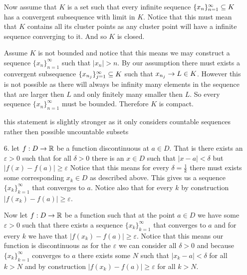 \documentclass[12pt]{amsart}
\begin{document}
\begin{itemize}
        Now assume that $K$ is a set such that every infinite sequence
        $\{x_n\}_{n=1}^\infty\subseteq K$ has a convergent subsequence with limit in $K$.
        Notice that this must mean that $K$ contains all its cluster points as any
        cluster point will have a infinite sequence converging to it. And so $K$ is
        closed.

        Assume $K$ is not bounded and notice that this means we may construct a
        sequence $\{x_n\}_{n=1}^\infty$ such that $|x_n|>n$. By our assumption there
        must exists a convergent subsequence $\{x_{n_j}\}_{j=1}^\infty\subseteq K$ such that
        $x_{n_j}\rightarrow L\in K$. However this is not possible as there will always be
        infinity many elements in the sequence that are larger then $L$ and only finitely many smaller then $L$. So every
        sequence $\{x_n\}_{n=1}^\infty$ must be bounded. Therefore $K$ is compact.

        this statement is slightly stronger as it only considers countable sequences
        rather then possible uncountable subsets

    \item[6.] let $f:D\rightarrow\mathbb{R}$ be a function discontinuous at $a\in D$. That is there exists an
        $\varepsilon>0$ such that for all $\delta>0$ there is an $x\in D$ such that $|x-a|<\delta$
        but $|f(x)-f(a)|\geq \varepsilon$
        Notice that this means for every $\delta = \frac{1}{k}$ there must exists some corresponding 
        $x_k\in D$ as described above.
        This gives us a sequence $\{x_k\}_{k=1}^\infty$ that converges to $a$. Notice also that for every 
        $k$ by construction $|f(x_k)-f(a)|\geq \varepsilon$.

        Now let $f:D\rightarrow\mathbb{R}$ be a function such that at the point $a\in D$ we have some
        $\varepsilon>0$ such that there exists a sequence $\{x_k\}_{k=1}^\infty$
        that converges to $a$ and for every $k$ we have that $|f(x_k)-f(a)|\geq \varepsilon$.
        Notice that this means our function is discontinuous as for the $\varepsilon$
        we can consider all $\delta>0$ and because $\{x_k\}_{k=1}^\infty$ converges to
        $a$ there exists some $N$ such that $|x_k-a|<\delta$ for all $k>N$ and by
        construction $|f(x_k)-f(a)|\geq \varepsilon$ for all $k>N$.



\end{itemize}
\end{document}
